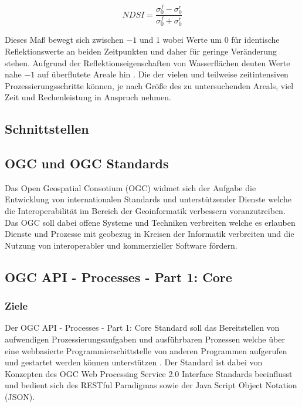 \begin{equation}
    NDSI = \frac{\sigma_0^f-\sigma_0^r}{\sigma_0^f+\sigma_0^r}
\end{equation} 

Dieses Maß bewegt sich zwischen $-1$ und $1$ wobei 
Werte um $0$ für identische Reflektionswerte an beiden Zeitpunkten und daher für geringe Veränderung stehen. 
Aufgrund der Reflektionseigenschaften von Wasserflächen deuten Werte nahe $-1$ auf überflutete Areale hin \cite{flood_proxy_mapping_ndsi}. 
Die der vielen und teilweise zeitintensiven Prozessierungsschritte können, je nach Größe des zu untersuchenden Areals, viel Zeit und Rechenleistung in Anspruch nehmen.

\subsection{Schnittstellen}
\subsection{OGC und OGC Standards}
Das Open Geospatial Consotium (OGC) widmet sich der Aufgabe die Entwicklung von internationalen Standards und unterstützender Dienste welche die Interoperabilität im 
Bereich der Geoinformatik verbessern voranzutreiben. Das OGC soll dabei offene Systeme und Techniken verbreiten welche es erlauben Dienste und Prozesse mit geobezug
in Kreisen der Informatik verbreiten und die Nutzung von interoperabler und kommerzieller Software fördern.

\subsection{OGC API - Processes - Part 1: Core}
\subsubsection{Ziele}
Der OGC API - Processes - Part 1: Core Standard soll das Bereitstellen von aufwendigen Prozessierungsaufgaben und ausführbaren Prozessen welche über eine webbasierte 
Programmierschittstelle von anderen Programmen aufgerufen und gestartet werden können unterstützen \cite{ogc_api_processes_core}. Der Standard ist dabei von Konzepten des 
OGC Web Processing Service 2.0 Interface Standards beeinflusst und bedient sich des RESTful Paradigmas sowie der Java Script Object Notation (JSON).
